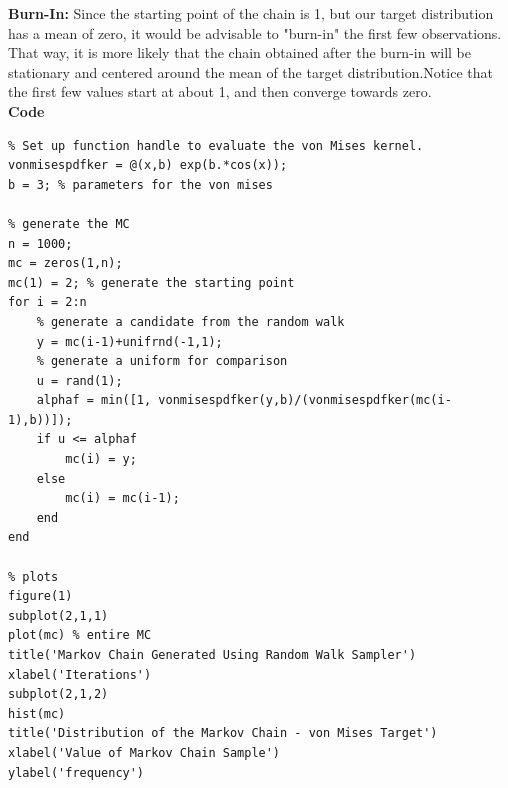 \documentclass[12pt,a4paper]{article}
\begin{document}
\textbf{Burn-In:} Since the starting point of the chain is 1, but our target distribution has a mean of zero, it would be advisable to "burn-in" the first few observations. That way, it is more likely that the chain obtained after the burn-in will be stationary and centered around the mean of the target distribution.Notice that the first few values start at about 1, and then converge towards zero.\\
\clearpage
\textbf{Code}
\begin{verbatim}
% Set up function handle to evaluate the von Mises kernel.
vonmisespdfker = @(x,b) exp(b.*cos(x));
b = 3; % parameters for the von mises

% generate the MC
n = 1000;
mc = zeros(1,n);
mc(1) = 2; % generate the starting point
for i = 2:n
    % generate a candidate from the random walk
    y = mc(i-1)+unifrnd(-1,1);
    % generate a uniform for comparison
    u = rand(1);
    alphaf = min([1, vonmisespdfker(y,b)/(vonmisespdfker(mc(i-1),b))]);
    if u <= alphaf
        mc(i) = y;
    else
        mc(i) = mc(i-1);
    end
end

% plots
figure(1)
subplot(2,1,1)
plot(mc) % entire MC
title('Markov Chain Generated Using Random Walk Sampler')
xlabel('Iterations')
subplot(2,1,2)
hist(mc)
title('Distribution of the Markov Chain - von Mises Target')
xlabel('Value of Markov Chain Sample')
ylabel('frequency')
\end{verbatim}
\clearpage
\end{document}
